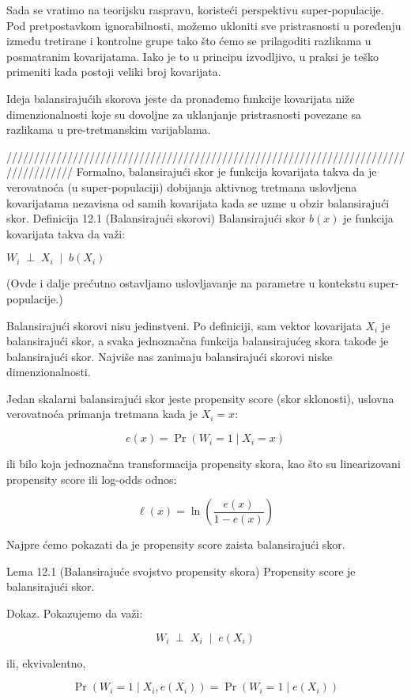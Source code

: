 \documentclass[12pt, a4paper]{article}
\begin{document}
Sada se vratimo na teorijsku raspravu, koristeći perspektivu super-populacije.
Pod pretpostavkom ignorabilnosti, možemo ukloniti sve pristrasnosti u poređenju između tretirane i kontrolne grupe tako što ćemo se prilagoditi razlikama u posmatranim kovarijatama. Iako je to u principu izvodljivo, u praksi je teško primeniti kada postoji veliki broj kovarijata.

Ideja balansirajućih skorova jeste da pronađemo funkcije kovarijata niže dimenzionalnosti koje su dovoljne za uklanjanje pristrasnosti povezane sa razlikama u pre-tretmanskim varijablama.

////////////////////////////////////////////////////////////////////////////////////
Formalno, balansirajući skor je funkcija kovarijata takva da je verovatnoća (u super-populaciji) dobijanja aktivnog tretmana uslovljena kovarijatama nezavisna od samih kovarijata kada se uzme u obzir balansirajući skor.
Definicija 12.1 (Balansirajući skorovi)
Balansirajući skor $b(x)$ je funkcija kovarijata takva da važi:

\( W_i \;\perp\; X_i \;\mid\; b(X_i) \)

(Ovde i dalje prećutno ostavljamo uslovljavanje na parametre u kontekstu super-populacije.)

Balansirajući skorovi nisu jedinstveni. Po definiciji, sam vektor kovarijata \( X_i \) je balansirajući skor, a svaka jednoznačna funkcija balansirajućeg skora takođe je balansirajući skor. Najviše nas zanimaju balansirajući skorovi niske dimenzionalnosti.

Jedan skalarni balansirajući skor jeste propensity score (skor sklonosti), uslovna verovatnoća primanja tretmana kada je \( X_i = x \):

\[ e(x) = \Pr(W_i = 1 \mid X_i = x) \]

ili bilo koja jednoznačna transformacija propensity skora, kao što su linearizovani propensity score ili log-odds odnos:

\[ \ell(x) = \ln \left(\frac{e(x)}{1 - e(x)}\right) \]

Najpre ćemo pokazati da je propensity score zaista balansirajući skor.

Lema 12.1 (Balansirajuće svojstvo propensity skora)
Propensity score je balansirajući skor.

Dokaz. Pokazujemo da važi:

\[ W_i \;\perp\; X_i \;\mid\; e(X_i) \]

ili, ekvivalentno,

\[ \Pr(W_i = 1 \mid X_i, e(X_i)) = \Pr(W_i = 1 \mid e(X_i)) \]
\end{document}

